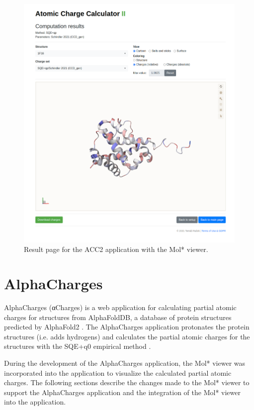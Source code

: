 \documentclass[
  digital,     %
  oneside,     %
  nosansbold,  %
  nocolorbold, %
  lof,         %
  lot,         %
]{fithesis4}
\begin{document}
\begin{figure}[htbp]
  \begin{center}
    \includegraphics[width=\textwidth]{figures/results-full.png}
  \end{center}
  \caption{Result page for the ACC2 application with the Mol* viewer.}
  \label{fig:result_page}
\end{figure}

\chapter{AlphaCharges}

AlphaCharges (αCharges) is a web application for calculating partial atomic charges for structures from AlphaFoldDB, a database of protein structures predicted by AlphaFold2 \cite{jumper2021alphafold}. The AlphaCharges application protonates the protein structures (i.e. adds hydrogens) and calculates the partial atomic charges for the structures with the SQE+q0 empirical method \cite{schindler2021sqe}. \cite{schindler2023alphacharges}

During the development of the AlphaCharges application, the Mol* viewer was incorporated into the application to visualize the calculated partial atomic charges. The following sections describe the changes made to the Mol* viewer to support the AlphaCharges application and the integration of the Mol* viewer into the application.
\end{document}

